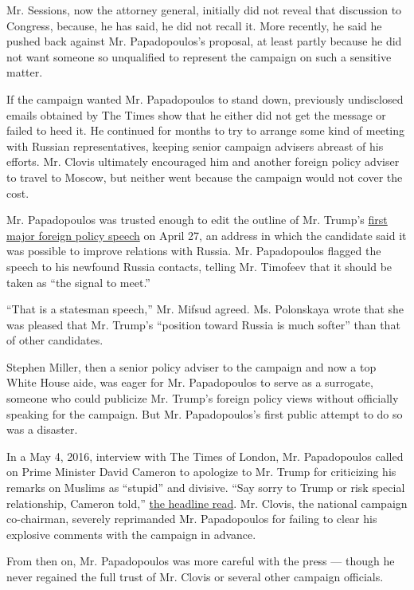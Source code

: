 Mr. Sessions, now the attorney general, initially did not reveal that
discussion to Congress, because, he has said, he did not recall it. More
recently, he said he pushed back against Mr. Papadopoulos's proposal, at
least partly because he did not want someone so unqualified to represent
the campaign on such a sensitive matter.

If the campaign wanted Mr. Papadopoulos to stand down, previously
undisclosed emails obtained by The Times show that he either did not get
the message or failed to heed it. He continued for months to try to
arrange some kind of meeting with Russian representatives, keeping
senior campaign advisers abreast of his efforts. Mr. Clovis ultimately
encouraged him and another foreign policy adviser to travel to Moscow,
but neither went because the campaign would not cover the cost.

Mr. Papadopoulos was trusted enough to edit the outline of Mr. Trump's
\href{https://www.nytimes.com/2016/04/28/us/politics/donald-trump-foreign-policy-speech.html}{first
major foreign policy speech} on April 27, an address in which the
candidate said it was possible to improve relations with Russia. Mr.
Papadopoulos flagged the speech to his newfound Russia contacts, telling
Mr. Timofeev that it should be taken as ``the signal to meet.''

``That is a statesman speech,'' Mr. Mifsud agreed. Ms. Polonskaya wrote
that she was pleased that Mr. Trump's ``position toward Russia is much
softer'' than that of other candidates.

Stephen Miller, then a senior policy adviser to the campaign and now a
top White House aide, was eager for Mr. Papadopoulos to serve as a
surrogate, someone who could publicize Mr. Trump's foreign policy views
without officially speaking for the campaign. But Mr. Papadopoulos's
first public attempt to do so was a disaster.

In a May 4, 2016, interview with The Times of London, Mr. Papadopoulos
called on Prime Minister David Cameron to apologize to Mr. Trump for
criticizing his remarks on Muslims as ``stupid'' and divisive. ``Say
sorry to Trump or risk special relationship, Cameron told,''
\href{https://www.thetimes.co.uk/article/say-sorry-to-trump-or-risk-special-relationship-cameron-told-h6ng0r7xj}{the
headline read}. Mr. Clovis, the national campaign co-chairman, severely
reprimanded Mr. Papadopoulos for failing to clear his explosive comments
with the campaign in advance.

From then on, Mr. Papadopoulos was more careful with the press ---
though he never regained the full trust of Mr. Clovis or several other
campaign officials.

